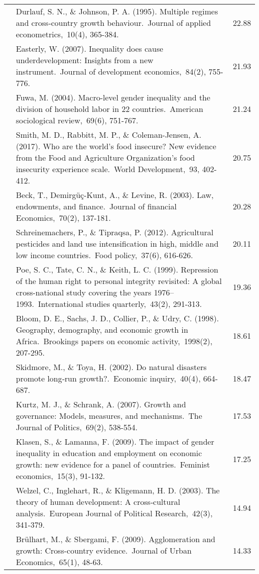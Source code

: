 \documentclass[
  man,floatsintext]{apa6}
\begin{document}
\begin{center}
\begin{ThreePartTable}
{\begin{longtable}{m{2cm}m{11cm}m{2cm}}
 & Durlauf, S. N., \& Johnson, P. A. (1995). Multiple regimes and cross‐country growth behaviour. Journal of applied econometrics, 10(4), 365-384. & 22.88\\
 & Easterly, W. (2007). Inequality does cause underdevelopment: Insights from a new instrument. Journal of development economics, 84(2), 755-776. & 21.93\\
 & Fuwa, M. (2004). Macro-level gender inequality and the division of household labor in 22 countries. American sociological review, 69(6), 751-767. & 21.24\\
 & Smith, M. D., Rabbitt, M. P., \& Coleman-Jensen, A. (2017). Who are the world’s food insecure? New evidence from the Food and Agriculture Organization’s food insecurity experience scale. World Development, 93, 402-412. & 20.75\\
 & Beck, T., Demirgüç-Kunt, A., \& Levine, R. (2003). Law, endowments, and finance. Journal of financial Economics, 70(2), 137-181. & 20.28\\
 & Schreinemachers, P., \& Tipraqsa, P. (2012). Agricultural pesticides and land use intensification in high, middle and low income countries. Food policy, 37(6), 616-626. & 20.11\\
 & Poe, S. C., Tate, C. N., \& Keith, L. C. (1999). Repression of the human right to personal integrity revisited: A global cross-national study covering the years 1976–1993. International studies quarterly, 43(2), 291-313. & 19.36\\
 & Bloom, D. E., Sachs, J. D., Collier, P., \& Udry, C. (1998). Geography, demography, and economic growth in Africa. Brookings papers on economic activity, 1998(2), 207-295. & 18.61\\
 & Skidmore, M., \& Toya, H. (2002). Do natural disasters promote long‐run growth?. Economic inquiry, 40(4), 664-687. & 18.47\\
 & Kurtz, M. J., \& Schrank, A. (2007). Growth and governance: Models, measures, and mechanisms. The Journal of Politics, 69(2), 538-554. & 17.53\\
 & Klasen, S., \& Lamanna, F. (2009). The impact of gender inequality in education and employment on economic growth: new evidence for a panel of countries. Feminist economics, 15(3), 91-132. & 17.25\\
 & Welzel, C., Inglehart, R., \& Kligemann, H. D. (2003). The theory of human development: A cross‐cultural analysis. European Journal of Political Research, 42(3), 341-379. & 14.94\\
 & Brülhart, M., \& Sbergami, F. (2009). Agglomeration and growth: Cross-country evidence. Journal of Urban Economics, 65(1), 48-63. & 14.33\\

\end{longtable}}
\end{ThreePartTable}
\end{center}
\end{document}
